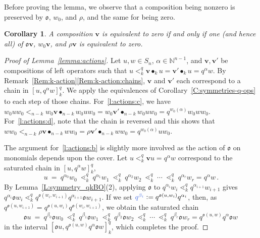 \documentclass[12pt,oneside,reqno]{amsart}
\newtheorem{corollary}[theorem]{Corollary}
\theoremstyle{definition}
\numberwithin{equation}{section}
\newcommand{\NN}{{\mathbb N}}
\newcommand{\qv}{{\mathbf v}}
\DeclareMathOperator{\kactionop}{{\scriptstyle \bullet}}
\newcommand{\kaction}[1][k]{\kactionop_{#1}}
\newcommand{\defcolor}[1]{{\color{RoyalBlue}#1}}
\newcommand{\ncycle}{\mathfrak o}
\begin{document}
Before proving the lemma, we observe
that a composition being nonzero is preserved by $\ncycle$, $w_0$, and $\rho$, and the same for being zero.

\begin{corollary}\label{C:symmetries_bzero}
  A composition $\qv$ is equivalent to zero if and only if one (and hence all) of $\ncycle\qv$, $w_0\qv$, and $\rho\qv$ is equivalent to
  zero. 
\end{corollary}

\begin{proof}[Proof of Lemma~\ref{lemma:actions}]
  Let $u,w\in S_n$, $\alpha\in\NN^{n-1}$, and $\qv,\qv'$ be compositions of left operators such that
  $u<_k^q \qv\kaction u=\qv'\kaction u = q^\alpha w$.
  By Remark~\ref{Rem:k-action}\ref{Rem:k-action:chains},  $\qv$ and $\qv'$ each correspond to a chain in $[u,q^\alpha w]_k^q$.
  We apply the equivalences of Corollary~\ref{C:symmetries-q-ops} to each step of those chains.
  For~\ref{l:actions:c}, we have
  $w_0 uw_0 <_{n-k} w_0\qv\kactionop_{n-k} w_0uw_0 =  w_0\qv'\kactionop_{n-k} w_0uw_0 = q^{w_0(\alpha)}w_0 ww_0$.
  For~\ref{l:actions:d}, note that the chain is reversed and this shows that 
  $w w_0 <_{n-k} \rho\qv\kactionop_{n-k} w w_0 =  \rho\qv'\kactionop_{n-k} w w_0 = q^{w_0(\alpha)}u w_0$.

  The argument for~\ref{l:actions:b} is slightly more involved as the action of $\ncycle$ on monomials depends upon the cover.
  Let $u<_k^q \qv u =  q^{\alpha} w$ correspond to the saturated chain in $[u,q^\alpha w]_k^q$,
  \[
      u\ =\ q^{\alpha_0}w_0\ \lessdot_k^q\ q^{\alpha_1}w_1\ \lessdot_k^q\ q^{\alpha_2}w_2
      \ \lessdot_k^q\ \dotsb\  \lessdot_k^q\ q^{\alpha_r}w_r=q^\alpha w\,.
  \]
  By Lemma~\ref{L:symmetry_qkBO}(2), applying $\ncycle$ to $q^{\alpha_i}w_i\lessdot_k^q q^{\alpha_{i+1}}w_{i+1}$ gives
  $q^{\alpha_i}\ncycle w_i\lessdot_k^q q^{\ncycle(w_i,w_{i+1})}q^{\alpha_{i+1}}\ncycle w_{i+1}$.
  If we set $\defcolor{q^{\beta_i}}\vcentcolon=q^{\ncycle(u,w_i)}q^{\alpha_i}$, then, as 
  $q^{\ncycle(u,w_{i+1})}=q^{\ncycle(u,w_i)}q^{\ncycle(w_i,w_{i+1})}$, we obtain the saturated chain
  \[
      \ncycle u\ =\ q^{\beta_0}\ncycle w_0\ \lessdot_k^q\ q^{\beta_1}\ncycle w_1\ \lessdot_k^q\ q^{\beta_2}\ncycle w_2
      \ \lessdot_k^q\ \dotsb\  \lessdot_k^q\ q^{\beta_r}\ncycle w_r=q^{\ncycle(u,w)}q^\alpha \ncycle w\,
  \]
  in the interval $[\ncycle u,q^{\ncycle(u,w)} q^\alpha \ncycle w]_k^q$, which completes the proof.  
\end{proof}
\end{document}
